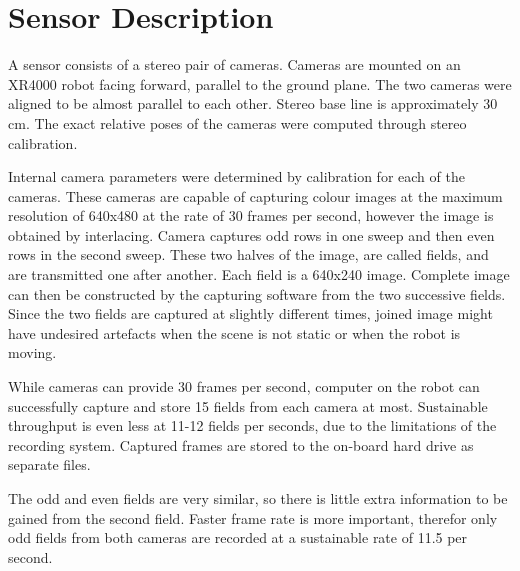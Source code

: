 \section{Sensor Description}

A sensor consists of a stereo pair of cameras. Cameras are mounted on
an XR4000 robot facing forward, parallel to the ground plane. The two
cameras were aligned to be almost parallel to each other. Stereo base
line is approximately 30 cm. The exact relative poses of the cameras
were computed through stereo calibration.

Internal camera parameters were determined by calibration for each of
the cameras. These cameras are capable of capturing colour images at
the maximum resolution of 640x480 at the rate of 30 frames per second,
however the image is obtained by interlacing. Camera captures odd rows
in one sweep and then even rows in the second sweep. These two halves
of the image, are called fields, and are transmitted one after
another. Each field is a 640x240 image.  Complete image can then be
constructed by the capturing software from the two successive fields.
Since the two fields are captured at slightly different times, joined
image might have undesired artefacts when the scene is not static or
when the robot is moving.

While cameras can provide 30 frames per second, computer on the robot
can successfully capture and store 15 fields from each camera at most.
Sustainable throughput is even less at 11-12 fields per seconds, due
to the limitations of the recording system. Captured frames are stored
to the on-board hard drive as separate files.

The odd and even fields are very similar, so there is little extra
information to be gained from the second field. Faster frame rate is
more important, therefor only odd fields from both cameras are
recorded at a sustainable rate of 11.5 per second.

